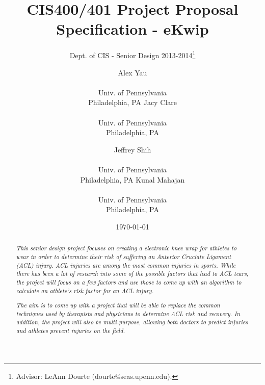 \documentclass{sig-alternate}
\begin{document}
 
\nocite{*}
\title{CIS400/401 Project Proposal Specification - eKwip}
\subtitle{Dept. of CIS - Senior Design 2013-2014\thanks{Advisor: LeAnn Dourte (dourte@seas.upenn.edu).}}
\author{
\alignauthor Alex Yau \\  \\ Univ. of Pennsylvania \\ Philadelphia, PA
\alignauthor Jacy Clare \\  \\ Univ. of Pennsylvania \\ Philadelphia, PA
\and 
\alignauthor Jeffrey Shih \\  \\ Univ. of Pennsylvania \\ Philadelphia, PA
\alignauthor Kunal Mahajan \\  \\ Univ. of Pennsylvania \\ Philadelphia, PA}
\date{\today}
\maketitle

\begin{abstract}

  \textit{This senior design project focuses on creating a electronic knee wrap for athletes to wear in order to determine their risk of suffering an Anterior Cruciate Ligament (ACL) injury. ACL injuries are among the most common injuries in sports. While there has been a lot of research into some of the possible factors that lead to ACL tears, the project will focus on a few factors and use those to come up with an algorithm to calculate an athlete's risk factor for an ACL injury.}

  \textit{The aim is to come up with a project that will be able to replace the common techniques used by therapists and physicians to determine ACL risk and recovery. In addition, the project will also be multi-purpose, allowing both doctors to predict injuries and athletes prevent injuries on the field.}

\end{abstract}
\end{document}
